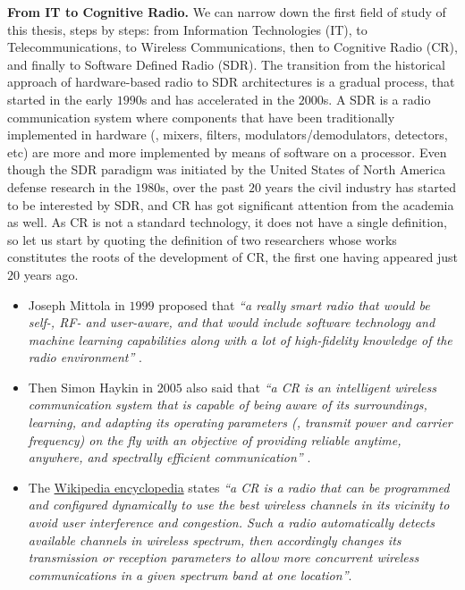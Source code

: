 \textbf{From IT to Cognitive Radio.}
%
We can narrow down the first field of study of this thesis, steps by steps:
from Information Technologies (IT), to Telecommunications, to Wireless Communications, then to Cognitive Radio (CR),
and finally to Software Defined Radio (SDR).
%
The transition from the historical approach of hardware-based radio to SDR architectures is a gradual process, that started in the early $1990$s and has accelerated in the $2000$s.
A SDR is a radio communication system where components that have been traditionally implemented in hardware (\eg, mixers, filters, modulators/demodulators, detectors, etc) are more and more implemented by means of software on a processor.
Even though the SDR paradigm was initiated by the United States of North America defense research in the $1980$s, over the past $20$ years the civil industry has started to be interested by SDR, and CR has got significant attention from the academia as well.
%
As CR is not a standard technology, it does not have a single definition, so let us start by quoting the definition of two researchers whose works constitutes the roots of the development of CR, the first one having appeared just $20$ years ago.
%
\begin{itemize}\tightlist
    \item
    Joseph Mittola in $1999$ proposed that
    \emph{``a really smart radio that would be self-, RF- and user-aware, and that would include software technology and machine learning capabilities along with a lot of high-fidelity knowledge of the radio environment''} \cite{Mitola99}.

    \item
    Then Simon Haykin in $2005$ also said that
    \emph{``a CR is an intelligent wireless communication system that is capable of being aware of its surroundings, learning, and adapting its operating parameters (\eg, transmit power and carrier frequency) on the fly with an objective of providing reliable anytime, anywhere, and spectrally efficient communication''} \cite{Haykin05}.

    \item
    The \href{https://en.wikipedia.org/wiki/Cognitive_radio}{Wikipedia encyclopedia} states
    \emph{``a CR is a radio that can be programmed and configured dynamically to use the best wireless channels in its vicinity to avoid user interference and congestion. Such a radio automatically detects available channels in wireless spectrum, then accordingly changes its transmission or reception parameters to allow more concurrent wireless communications in a given spectrum band at one location''}.
\end{itemize}


